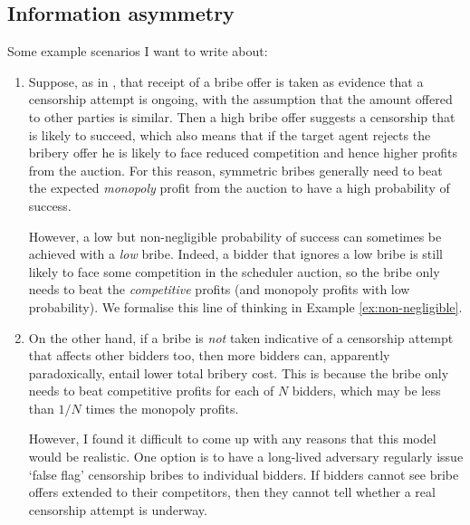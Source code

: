 \subsection{Information asymmetry}

Some example scenarios I want to write about:
\begin{enumerate}
  \item
    Suppose, as in \cite{FPR}, that receipt of a bribe offer is taken as evidence that a censorship attempt is ongoing, with the assumption that the amount offered to other parties is similar.
    Then a high bribe offer suggests a censorship that is likely to succeed, which also means that if the target agent rejects the bribery offer he is likely to face reduced competition and hence higher profits from the auction.
    For this reason, symmetric bribes generally need to beat the expected \emph{monopoly} profit from the auction to have a high probability of success.

    However, a low but non-negligible probability of success can sometimes be achieved with a \emph{low} bribe.
    Indeed, a bidder that ignores a low bribe is still likely to face some competition in the scheduler auction, so the bribe only needs to beat the \emph{competitive} profits (and monopoly profits with low probability).
    We formalise this line of thinking in Example \ref{ex:non-negligible}.

  \item
    On the other hand, if a bribe is \emph{not} taken indicative of a censorship attempt that affects other bidders too, then more bidders can, apparently paradoxically, entail lower total bribery cost.
    This is because the bribe only needs to beat competitive profits for each of $N$ bidders, which may be less than $1/N$ times the monopoly profits.

    However, I found it difficult to come up with any reasons that this model would be realistic.
    One option is to have a long-lived adversary regularly issue `false flag' censorship bribes to individual bidders.
    If bidders cannot see bribe offers extended to their competitors, then they cannot tell whether a real censorship attempt is underway.


\end{enumerate}


